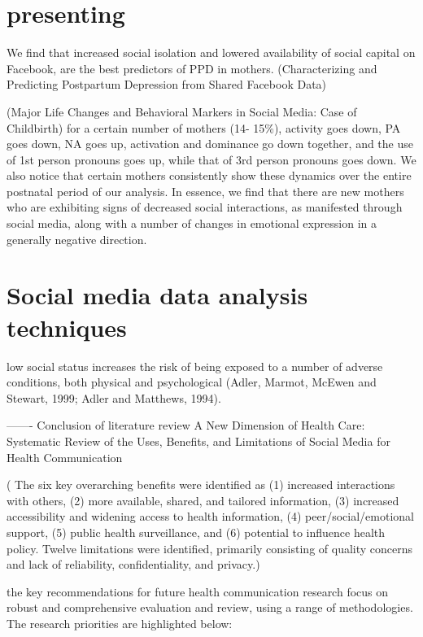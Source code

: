 \section{presenting}

We find that increased social isolation and lowered availability of social capital on Facebook, are the best predictors of PPD in mothers. (Characterizing and Predicting Postpartum Depression from Shared Facebook Data)


(Major Life Changes and Behavioral Markers in Social
Media: Case of Childbirth)
for a certain number of mothers (14-
15\%), activity goes down, PA goes down, NA goes up,
activation and dominance go down together, and the use of
1st person pronouns goes up, while that of 3rd person
pronouns goes down. We also notice that certain mothers
consistently show these dynamics over the entire postnatal
period of our analysis. In essence, we find that there are
new mothers who are exhibiting signs of decreased social
interactions, as manifested through social media, along with
a number of changes in emotional expression in a generally
negative direction.

\section{Social media data analysis techniques}

low social status increases the risk of being exposed to a number of adverse conditions, both physical and psychological (Adler, Marmot, McEwen and Stewart, 1999; Adler and Matthews, 1994). 


-------
Conclusion of literature review 
A New Dimension of Health Care: Systematic Review of the Uses, Benefits, and Limitations of Social Media for Health Communication

( The six key overarching benefits were identified as (1) increased interactions with others, (2) more available, shared, and tailored information, (3) increased accessibility and widening access to health information, (4) peer/social/emotional support, (5) public health surveillance, and (6) potential to influence health policy. Twelve limitations were identified, primarily consisting of quality concerns and lack of reliability, confidentiality, and privacy.)


 the key recommendations for future health communication research focus on robust and comprehensive evaluation and review, using a range of methodologies. The research priorities are highlighted below:

